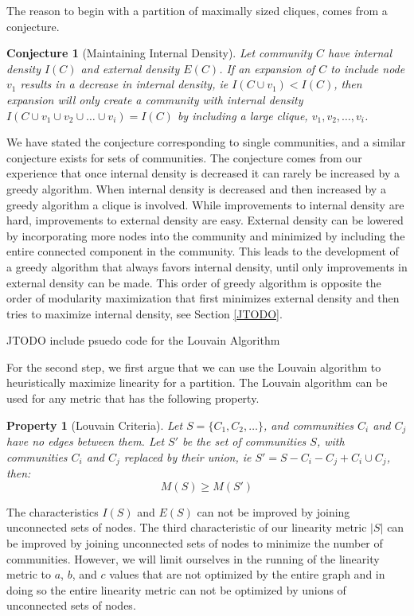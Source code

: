 \documentclass[phd,tocprelim]{cornell}
\newtheorem{conjecture}[definition]{Conjecture}
\newtheorem{property}[definition]{Property}
\begin{document}
The reason to begin with a partition of maximally sized cliques, comes from a conjecture.
\begin{conjecture}[Maintaining Internal Density]
Let community $C$ have internal density $I(C)$ and external density $E(C)$.  If an expansion of $C$ to include node $v_1$ results in a decrease in internal density, ie $I(C \cup v_1) < I(C)$, then expansion will only create a community with internal density $I(C \cup v_1 \cup v_2 \cup \dots \cup v_i) = I(C)$ by including a large clique, $v_1, v_2, \dots, v_i$.
\label{conj:int_density}
\end{conjecture}
We have stated the conjecture corresponding to single communities, and a similar conjecture exists for sets of communities.  The conjecture comes from our experience that once internal density is decreased it can rarely be increased by a greedy algorithm.  When internal density is decreased and then increased by a greedy algorithm a clique is involved.  While improvements to internal density are hard, improvements to external density are easy.  External density can be lowered by incorporating more nodes into the community and minimized by including the entire connected component in the community. This leads to the development of a greedy algorithm that always favors internal density, until only improvements in external density can be made.  This order of greedy algorithm is opposite the order of modularity maximization that first minimizes external density and then tries to maximize internal density, see Section \ref{JTODO}.

JTODO include psuedo code for the Louvain Algorithm

For the second step, we first argue that we can use the Louvain algorithm to heuristically maximize linearity for a partition.  The Louvain algorithm can be used for any metric that has the following property.
\begin{property}[Louvain Criteria]
Let $S = \{C_1, C_2, \dots \}$, and communities $C_i$ and $C_j$ have no edges between them.  Let $S'$ be the set of communities $S$, with communities $C_i$ and $C_j$ replaced by their union, ie $S' = S - C_i - C_j + C_i \cup C_j$, then:
\begin{equation}
M(S) \geq M(S')
\end{equation}
\end{property}
The characteristics $I(S)$ and $E(S)$ can not be improved by joining unconnected sets of nodes.  The third characteristic of our linearity metric $|S|$ can be improved by joining unconnected sets of nodes to minimize the number of communities.  However, we will limit ourselves in the running of the linearity metric to $a$, $b$, and $c$ values that are not optimized by the entire graph and in doing so the entire linearity metric can not be optimized by unions of unconnected sets of nodes.
\end{document}
